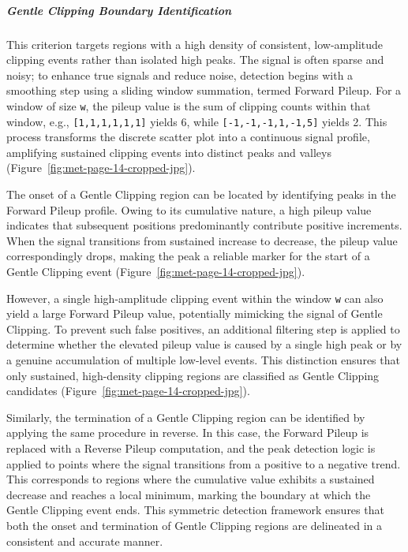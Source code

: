 \documentclass[pdflatex,sn-nature]{sn-jnl}
\begin{document}
\subparagraph{Gentle Clipping Boundary Identification}

This criterion targets regions with a high density of consistent, low-amplitude clipping events rather than isolated high peaks. The signal is often sparse and noisy; to enhance true signals and reduce noise, detection begins with a smoothing step using a sliding window summation, termed Forward Pileup. For a window of size \texttt{w}, the pileup value is the sum of clipping counts within that window, e.g., \texttt{[1,1,1,1,1,1]} yields 6, while \texttt{[-1,-1,-1,1,-1,5]} yields 2. This process transforms the discrete scatter plot into a continuous signal profile, amplifying sustained clipping events into distinct peaks and valleys (Figure~\ref{fig:met-page-14-cropped-jpg}).

The onset of a Gentle Clipping region can be located by identifying peaks in the Forward Pileup profile. Owing to its cumulative nature, a high pileup value indicates that subsequent positions predominantly contribute positive increments. When the signal transitions from sustained increase to decrease, the pileup value correspondingly drops, making the peak a reliable marker for the start of a Gentle Clipping event (Figure~\ref{fig:met-page-14-cropped-jpg}).

However, a single high-amplitude clipping event within the window \texttt{w} can also yield a large Forward Pileup value, potentially mimicking the signal of Gentle Clipping. To prevent such false positives, an additional filtering step is applied to determine whether the elevated pileup value is caused by a single high peak or by a genuine accumulation of multiple low-level events. This distinction ensures that only sustained, high-density clipping regions are classified as Gentle Clipping candidates (Figure~\ref{fig:met-page-14-cropped-jpg}).

Similarly, the termination of a Gentle Clipping region can be identified by applying the same procedure in reverse. In this case, the Forward Pileup is replaced with a Reverse Pileup computation, and the peak detection logic is applied to points where the signal transitions from a positive to a negative trend. This corresponds to regions where the cumulative value exhibits a sustained decrease and reaches a local minimum, marking the boundary at which the Gentle Clipping event ends. This symmetric detection framework ensures that both the onset and termination of Gentle Clipping regions are delineated in a consistent and accurate manner.
\end{document}

